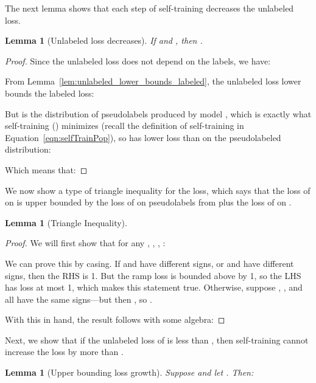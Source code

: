 \documentclass[11pt]{article}
\newtheorem{lemma}[theorem]{Lemma}
\begin{document}
The next lemma shows that each step of self-training decreases the unlabeled loss.

\begin{lemma}[Unlabeled loss decreases]
\label{lem:unlabeled_loss_decreases}
If  and , then .
\end{lemma}

\begin{proof}
Since the unlabeled loss does not depend on the labels, we have:

From Lemma~\ref{lem:unlabeled_lower_bounds_labeled}, the unlabeled loss lower bounds the labeled loss:

But  is the distribution of pseudolabels produced by model , which is exactly what self-training () minimizes (recall the definition of self-training in Equation~\eqref{eqn:selfTrainPop}), so  has lower loss than  on the pseudolabeled distribution:

Which means that:

\end{proof}

We now show a type of triangle inequality for the loss, which says that the loss of  on  is upper bounded by the loss of  on pseudolabels from  plus the loss of  on .

\begin{lemma}[Triangle Inequality]
\label{lem:unlabeled_triangle_inequality}

\end{lemma}

\begin{proof}

We will first show that for any , , , :

We can prove this by casing. If  and  have different signs, or  and  have different signs, then the RHS is 1.
But the ramp loss is bounded above by 1, so the LHS has loss at most 1, which makes this statement true.
Otherwise, suppose , , and  all have the same signs---but then , so .

With this in hand, the result follows with some algebra:

\end{proof}

Next, we show that if the unlabeled loss of  is less than , then self-training cannot increase the loss by more than .

\begin{lemma}[Upper bounding loss growth]
\label{lem:loss_growth_upper_bound}
Suppose  and let . Then:

\end{lemma}
\end{document}
